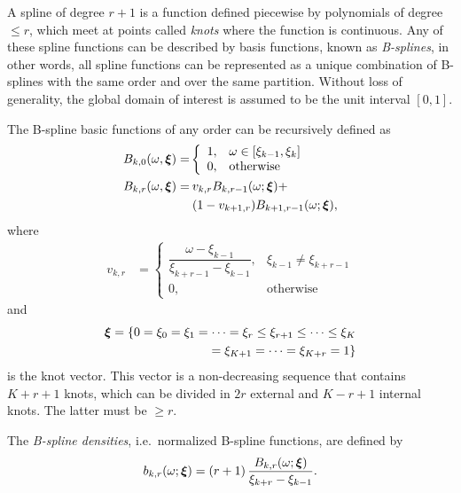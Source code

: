 \documentclass[twocolumn,final]{svjour3}
\newcommand{\bm}[1]{\mbox{\boldmath $#1$}}
\begin{document}
A spline of degree $r+1$ is a function defined piecewise by polynomials of degree $\leq r$, which meet at points called \textit{knots} where the function is continuous.  Any of these spline functions can be described by basis functions, known as \textit{B-splines}, in other words, all spline functions can be represented as a unique combination of B-splines with the same order and over the same partition.  Without loss of generality, the global domain of interest is assumed to be the unit interval $[0,1]$.

The B-spline basic functions of any order can be recursively defined as
\begin{align*}
B_{k,0}(\omega, \bm{\xi})=&	
\left\{
\begin{array}{ll}
1, & \omega \in [\xi_{k-1}, \xi_{k}] \\
0, & \mbox{otherwise} 
\end{array}
\right.\\
B_{k,r}(\omega, \bm{\xi}) = & \:v_{k,r}B_{k,r-1}(\omega; \bm{\xi}) + \\
& \: (1-v_{k+1,r})B_{k+1,r-1}(\omega; \bm{\xi}),	
\end{align*}
where	   
\begin{align*}	   
v_{k,r}&=	
\left\{
\begin{array}{ll}
\dfrac{\omega - \xi_{k-1}}{\xi_{k+r-1} - \xi_{k-1}}, & \xi_{k-1} \neq \xi_{k+r-1}\\
0, & \mbox{otherwise} 
\end{array}
\right.
\end{align*}
and 
\begin{align*}
\bm{\xi} = \{0 = \xi_0 = \xi_1 = \cdots = \xi_r \leq \xi_{r+1} \leq \cdots \leq \xi_{K}\\ = \xi_{K+1} = \cdots = \xi_{K+r} = 1 \}
\end{align*}
is the knot vector.  This vector is a non-decreasing sequence that contains $K+r+1$ knots, which can be divided in $2r$ external and $K-r+1$ internal knots.  The latter must be $\geq r$.


The \textit{B-spline densities}, i.e.\ normalized B-spline functions, are defined by
\begin{align*}
b_{k,r}(\omega; \bm{\xi}) = \left(r+1\right) \dfrac{B_{k,r}(\omega;\bm{\xi})}{\xi_{k+r} - \xi_{k-1}}.
\end{align*}
\end{document}

